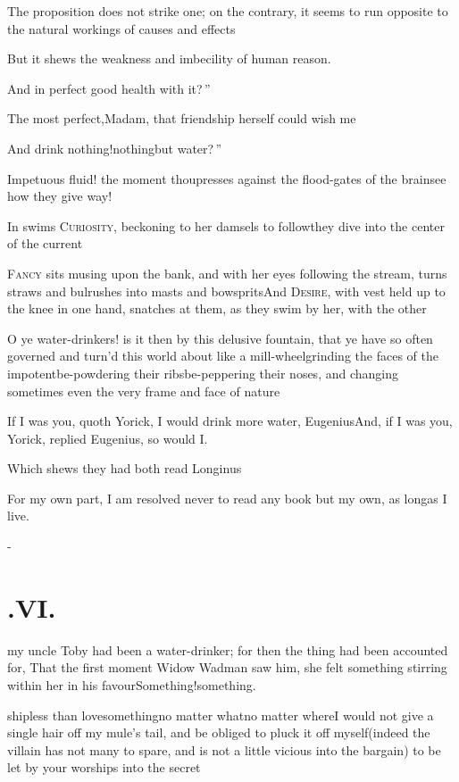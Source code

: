 \documentclass{article}
\begin{document}
\tsh The proposition does not strike one; on the
contrary, it seems to run opposite to the natural workings of causes and
effects\tsh

But it shews the weakness and imbecility of human reason.

\tsh \lqq And in perfect good health\break
\lqq with it?\,”

\tsk The most perfect,\tsk Madam, that\break
friendship herself could wish me\tsh

\tsk \lqq And drink nothing!\tsk nothing\break\lqq but water?\,”

\tsk Impetuous fluid! the moment thou\break presses against the
flood-gates of the brain\tsk see how they give
way!\tsh{}

In swims \textsc{Curiosity}, beckoning to her damsels to
follow\tsk they dive into the center of the
current\tsh

\textsc{Fancy} sits musing upon the bank, and with her
eyes following the stream, turns straws and bulrushes into masts
and bowsprits\tsh And \textsc{Desire}, with vest
held up to the knee in one hand, snatches at them, as they swim by
her, with the other\tsh

O ye water-drinkers! is it then by this delusive fountain, that
ye have so often governed and turn’d this world about like a mill-wheel\tsk grinding the faces of the
impotent\tsk be-powdering their ribs\tsk be-peppering their
noses, and changing sometimes even the very frame and face of
nature\tsh{}

\tsk If I was you, quoth Yorick, I would drink more water,
Eugenius\tsk And, if I was you, Yorick, replied
Eugenius, so would I.

Which shews they had both read Longinus\tsh

For my own part, I am resolved never to read any book but my
own, as long\break as I live.

\vfill{}\eject
\null\kern-\baselineskip
\section{.\enspace VI.}

 my uncle Toby had been
a water-drinker; for then the thing had been accounted for, That
the first moment Widow Wadman saw him, she felt something
stirring within her in his
favour\tsk Something!\tsk something.

\noindent
{}
ship\tsk less than
love\tsk some\-thing\tsk no matter what\tsk no matter
where\tsk I would not give a single hair off my mule’s tail, and
be obliged to pluck it off myself\break (indeed the villain has not many
to spare, and is not a little vicious into the bargain) to be let
by your worships into the secret\tsh{}
\end{document}
